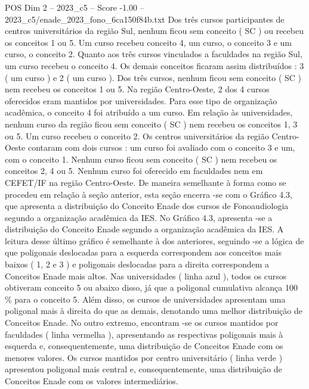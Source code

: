 \begin{textsample}{POS Dim 2 – 2023\_c5 – Score -1.00 – 2023\_c5/enade\_2023\_fono\_6ca150f84b.txt}
Dos três cursos participantes de centros universitários da região Sul, nenhum ficou sem conceito ( SC ) ou recebeu os conceitos 1 ou 5.
Um curso recebeu conceito 4, um curso, o conceito 3 e um curso, o conceito 2.
Quanto aos três cursos vinculados a faculdades na região Sul, um curso recebeu o conceito 4.
Os demais conceitos ficaram assim distribuídos : 3 ( um curso ) e 2 ( um curso ).
Dos três cursos, nenhum ficou sem conceito ( SC ) nem recebeu os conceitos 1 ou 5.
Na região Centro-Oeste, 2 dos 4 cursos oferecidos eram mantidos por universidades.
Para esse tipo de organização acadêmica, o conceito 4 foi atribuído a um curso.
Em relação às universidades, nenhum curso da região ficou sem conceito ( SC ) nem recebeu os conceitos 1, 3 ou 5.
Um curso recebeu o conceito 2.
Os centros universitários da região Centro-Oeste contaram com dois cursos : um curso foi avaliado com o conceito 3 e um, com o conceito 1.
Nenhum curso ficou sem conceito ( SC ) nem recebeu os conceitos 2, 4 ou 5.
Nenhum curso foi oferecido em faculdades nem em CEFET/IF na região Centro-Oeste.
De maneira semelhante à forma como se procedeu em relação à seção anterior, esta seção encerra -se com o Gráfico 4.3, que apresenta a distribuição do Conceito Enade dos cursos de Fonoaudiologia segundo a organização acadêmica da IES.
No Gráfico 4.3, apresenta -se a distribuição do Conceito Enade segundo a organização acadêmica da IES.
A leitura desse último gráfico é semelhante à dos anteriores, seguindo -se a lógica de que poligonais deslocadas para a esquerda correspondem aos conceitos mais baixos ( 1, 2 e 3 ) e poligonais deslocadas para a direita correspondem a Conceitos Enade mais altos.
Nas universidades ( linha azul ), todos os cursos obtiveram conceito 5 ou abaixo disso, já que a poligonal cumulativa alcança 100 \% para o conceito 5.
Além disso, os cursos de universidades apresentam uma poligonal mais à direita do que as demais, denotando uma melhor distribuição de Conceitos Enade.
No outro extremo, encontram -se os cursos mantidos por faculdades ( linha vermelha ), apresentando as respectivas poligonais mais à esquerda e, consequentemente, uma distribuição de Conceitos Enade com os menores valores.
Os cursos mantidos por centro universitário ( linha verde ) apresentou poligonal mais central e, consequentemente, uma distribuição de Conceitos Enade com os valores intermediários.

\end{textsample}
